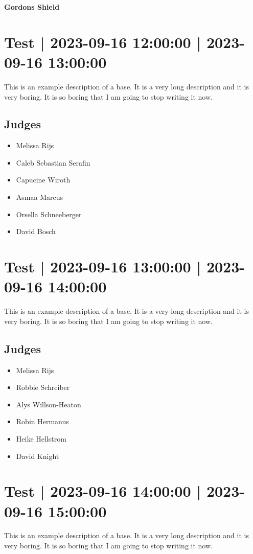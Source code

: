 \documentclass[10pt]{article}
\newcommand{\newtitle}[1]{\begin{center}{\Huge\bfseries #1 }\\ \vspace{5mm}\end{center}}
\begin{document}
	
	\newtitle{Gordons Shield}

			\setcounter{section}{2}
	\section{Test | 2023-09-16 12:00:00 | 2023-09-16 13:00:00}
	This is an example description of a base. It is a very long description and it is very boring. It is so boring that I am going to stop writing it now.

	\subsection*{Judges}
	\begin{itemize}

			\item Melissa Rijs
			\item Caleb Sebastian Serafin
			\item Capucine Wiroth
			\item Asmaa Marcus
			\item Orsella Schneeberger
			\item David Bosch
		\end{itemize}

			\setcounter{section}{3}
	\section{Test | 2023-09-16 13:00:00 | 2023-09-16 14:00:00}
	This is an example description of a base. It is a very long description and it is very boring. It is so boring that I am going to stop writing it now.

	\subsection*{Judges}
	\begin{itemize}

			\item Melissa Rijs
			\item Robbie Schreiber
			\item Alys Willson-Heaton
			\item Robin Hermanus
			\item Heike Hellstrom
			\item David Knight
		\end{itemize}

			\setcounter{section}{4}
	\section{Test | 2023-09-16 14:00:00 | 2023-09-16 15:00:00}
	This is an example description of a base. It is a very long description and it is very boring. It is so boring that I am going to stop writing it now.
\end{document}
